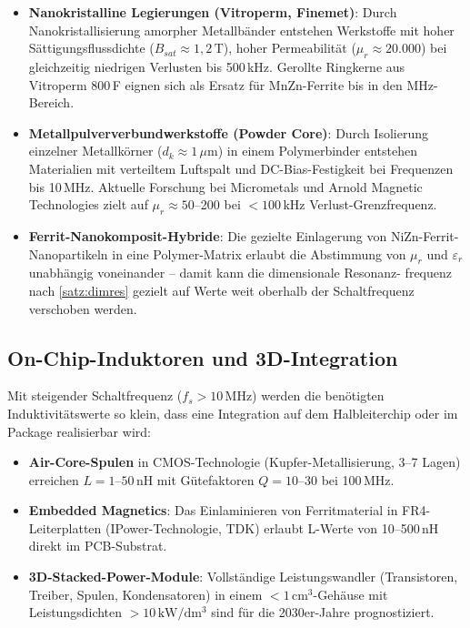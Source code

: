 ﻿\documentclass[a4paper,12pt,openany,oneside]{book}
\newcommand{\unterabschnitt}[1]{\subsection{#1}}
\theoremstyle{definition}
\begin{document}
\begin{itemize}
  \item \textbf{Nanokristalline Legierungen (Vitroperm, Finemet)}: Durch Nanokristallisierung
    amorpher Metallb\"ander entstehen Werkstoffe mit hoher S\"attigungsfluss\-dichte
    ($B_{sat} \approx 1{,}2\,\mathrm{T}$), hoher Permeabilit\"at ($\mu_r \approx 20.000$)
    bei gleichzeitig niedrigen Verlusten bis 500\,kHz. Gerollte Ringkerne aus
    Vitroperm 800\,F eignen sich als Ersatz f\"ur MnZn-Ferrite bis in den MHz-Bereich.
  \item \textbf{Metallpulververbundwerkstoffe (Powder Core)}: Durch Isolierung einzelner
    Metallk\"orner ($d_k \approx 1\,\mu\mathrm{m}$) in einem Polymerbinder entstehen
    Materialien mit verteiltem Luftspalt und DC-Bias-Festigkeit bei Frequenzen bis
    10\,MHz. Aktuelle Forschung bei Micrometals und Arnold Magnetic Technologies
    zielt auf $\mu_r \approx 50$--200 bei $< 100$\,kHz Verlust-Grenzfrequenz.
  \item \textbf{Ferrit-Nanokomposit-Hybride}: Die gezielte Einlagerung von NiZn-Ferrit-
    Nanopartikeln in eine Polymer-Matrix erlaubt die Abstimmung von $\mu_r$ und
    $\varepsilon_r$ unabh\"angig voneinander -- damit kann die dimensionale Resonanz-
    frequenz nach \autoref{satz:dimres} gezielt auf Werte weit oberhalb der Schaltfrequenz
    verschoben werden.
\end{itemize}

\unterabschnitt{On-Chip-Induktoren und 3D-Integration}

Mit steigender Schaltfrequenz ($f_s > 10\,\mathrm{MHz}$) werden die ben\"otigten
Induktivit\"atswerte so klein, dass eine Integration auf dem Halbleiterchip oder im
Package realisierbar wird:
\begin{itemize}
  \item \textbf{Air-Core-Spulen} in CMOS-Technologie (Kupfer-Metallisierung, 3--7 Lagen)
    erreichen $L = 1$--$50\,\mathrm{nH}$ mit G\"utefaktoren $Q = 10$--$30$ bei 100\,MHz.
  \item \textbf{Embedded Magnetics}: Das Einlaminieren von Ferritmaterial in FR4-Leiterplatten
    (IPower-Technologie, TDK) erlaubt L-Werte von 10--500\,nH direkt im PCB-Substrat.
  \item \textbf{3D-Stacked-Power-Module}: Vollst\"andige Leistungswandler (Transistoren,
    Treiber, Spulen, Kondensatoren) in einem $< 1\,\mathrm{cm}^3$-Geh\"ause mit
    Leistungsdichten $> 10\,\mathrm{kW/dm^3}$ sind f\"ur die 2030er-Jahre prognostiziert.
\end{itemize}
\end{document}
